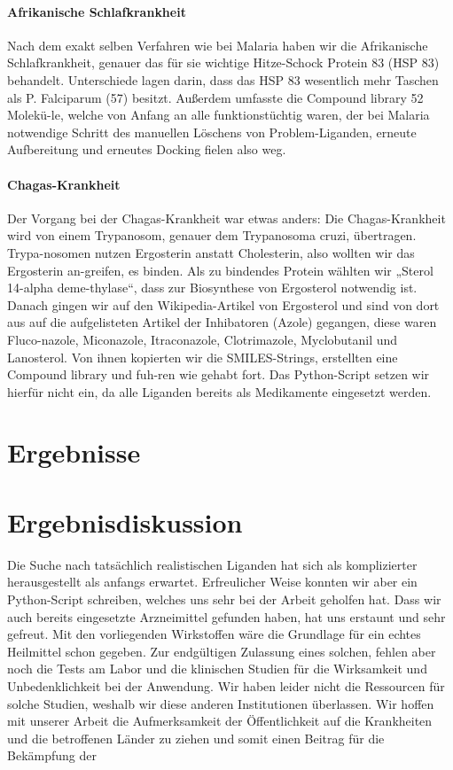 \documentclass[11pt]{article}
\begin{document}
    \paragraph{Afrikanische Schlafkrankheit}
    Nach dem exakt selben Verfahren wie bei Malaria haben wir die Afrikanische Schlafkrankheit, genauer das für sie wichtige Hitze-Schock Protein 83 (HSP 83) behandelt. Unterschiede lagen darin, dass das HSP 83 wesentlich mehr Taschen als P. Falciparum (57) besitzt. Außerdem umfasste die Compound library 52 Molekü-le, welche von Anfang an alle funktionstüchtig waren, der bei Malaria notwendige Schritt des manuellen Löschens von Problem-Liganden, erneute Aufbereitung und erneutes Docking fielen also weg.

    \paragraph{Chagas-Krankheit}
    Der Vorgang bei der Chagas-Krankheit war etwas anders: Die Chagas-Krankheit wird von einem Trypanosom, genauer dem Trypanosoma cruzi, übertragen. Trypa-nosomen nutzen Ergosterin anstatt Cholesterin, also wollten wir das Ergosterin an-greifen, es binden. Als zu bindendes Protein wählten wir „Sterol 14-alpha deme-thylase“, dass zur Biosynthese von Ergosterol notwendig ist.
    Danach gingen wir auf den Wikipedia-Artikel von Ergosterol und sind von dort aus auf die aufgelisteten Artikel der Inhibatoren (Azole) gegangen, diese waren Fluco-nazole, Miconazole, Itraconazole, Clotrimazole, Myclobutanil und Lanosterol. Von ihnen kopierten wir die SMILES-Strings, erstellten eine Compound library und fuh-ren wie gehabt fort. Das Python-Script setzen wir hierfür nicht ein, da alle Liganden bereits als Medikamente eingesetzt werden.


    \section{Ergebnisse}\label{sec:ergebnisse}



    \section{Ergebnisdiskussion}\label{sec:ergebnisdiskussion}
    Die Suche nach tatsächlich realistischen Liganden hat sich als komplizierter herausgestellt als anfangs erwartet. Erfreulicher Weise konnten wir aber ein Python-Script schreiben, welches uns sehr bei der Arbeit geholfen hat. Dass wir auch bereits eingesetzte Arzneimittel gefunden haben, hat uns erstaunt und sehr gefreut.
    Mit den vorliegenden Wirkstoffen wäre die Grundlage für ein echtes Heilmittel schon gegeben. Zur endgültigen Zulassung eines solchen, fehlen aber noch die Tests am Labor und die klinischen Studien für die Wirksamkeit und Unbedenklichkeit bei der Anwendung. Wir haben leider nicht die Ressourcen für solche Studien, weshalb wir diese anderen Institutionen überlassen.
    Wir hoffen mit unserer Arbeit die Aufmerksamkeit der Öffentlichkeit auf die Krankheiten und die betroffenen Länder zu ziehen und somit einen Beitrag für die Bekämpfung der
\end{document}

